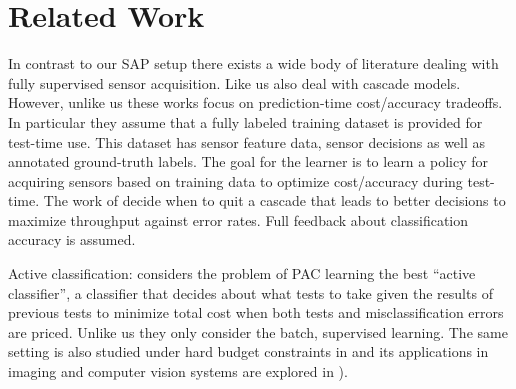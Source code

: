 %
%

\section{Related Work}
%

In contrast to our SAP setup there exists a wide body of literature dealing with fully supervised sensor acquisition. Like us \cite{AISTATS13_SupervisedSequentialLearning_TrapezSaligram} \cite{NIPS2015_DirectedAcyclic_WangTrapezSaligram}  \cite{NIPS2015_FeatureBudgeted_NanWangSaligrama} also deal with cascade models. However, unlike us these works focus on prediction-time cost/accuracy tradeoffs. In particular they assume that a fully labeled training dataset is provided for test-time use. This dataset has sensor feature data, sensor decisions as well as annotated ground-truth labels. The goal for the learner is to learn a policy for acquiring sensors based on training data to optimize cost/accuracy during test-time. The work of
\cite{poczos2009} decide when to quit a cascade that leads to better decisions to maximize throughput against error rates. Full feedback about classification accuracy is assumed.

Active classification: \cite{ActiveClass-AIJ-s} considers the problem of PAC learning the best ``active classifier'', a classifier that decides about what tests to take given the results of previous tests to minimize total cost when both tests and misclassification errors are priced.
Unlike us they only consider the batch, supervised learning. The same setting is also studied under hard budget constraints in \cite{LCunderBudget-ECML05} and its applications in imaging and computer vision systems are explored in  \cite{ADORE-99,isukapalli01efficient-ICJAI}).

